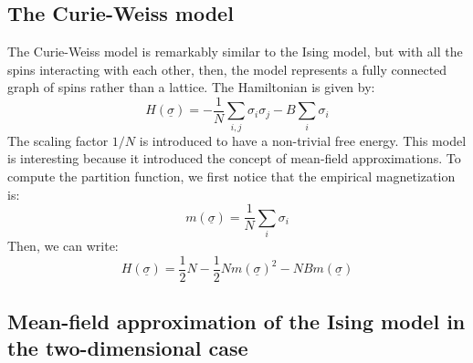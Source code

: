 \subsection{The Curie-Weiss model}
The Curie-Weiss model is remarkably similar to the Ising model, but with all the spins interacting with each other, then, the model represents a fully connected graph of spins rather than a lattice. The Hamiltonian is given by:
\begin{equation}
    H(\underline{\sigma}) = -\frac{1}{N}\sum_{i,j}\sigma_i\sigma_j - B\sum_i \sigma_i
\end{equation}
The scaling factor $1/N$ is introduced to have a non-trivial free energy. This model is interesting because it introduced the concept of mean-field approximations. To compute the partition function, we first notice that the empirical magnetization is:
\begin{equation}
    m(\underline{\sigma}) = \frac{1}{N}\sum_i  \sigma_i
\end{equation}
Then, we can write:
\begin{equation}
    H(\underline{\sigma}) = \frac{1}{2}N- \frac{1}{2}N m(\underline{\sigma})^2 - NB m(\underline{\sigma})
\end{equation}



\subsection{Mean-field approximation of the Ising model in the two-dimensional case}